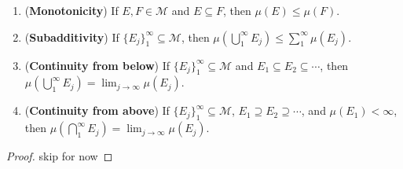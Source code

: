 \begin{theorem}
    \normalfont 
    \begin{enumerate}
       \item (\textbf{Monotonicity}) If $E, F \in \mathcal{M}$ and $E \subseteq F$, then $\mu(E) \le \mu(F)$.
       \item (\textbf{Subadditivity}) If $\{ E_j \}_1^{\infty} \subseteq \mathcal{M}$, then $\mu(\bigcup_{1}^{\infty} E_j) \le \sum_{1}^{\infty} \mu(E_j)$.
       \item (\textbf{Continuity from below}) If $\{ E_j \}_1^{\infty} \subseteq \mathcal{M}$ and $E_1 \subseteq E_2 \subseteq \cdots $, then $\mu(\bigcup_{1}^{\infty} E_j) = \lim_{j \to \infty} \mu(E_j)$.
       \item (\textbf{Continuity from above}) If $\{ E_j \}_1^{\infty} \subseteq \mathcal{M}$, $E_1 \supseteq E_2 \supseteq \cdots $, and $\mu(E_1) < \infty$, then $\mu(\bigcap_{1}^{\infty} E_j) = \lim_{j \to \infty} \mu(E_j)$.
    \end{enumerate}
\end{theorem}
\begin{proof}
   skip for now
\end{proof}

